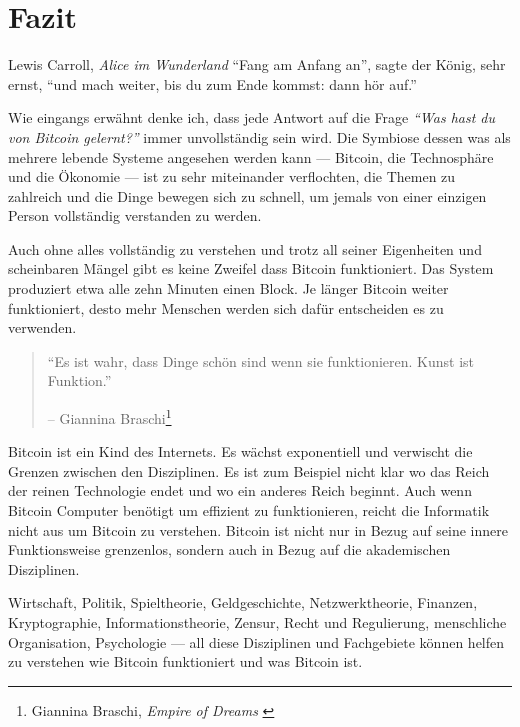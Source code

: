 \label{ch:conclusion}

\chapter*{Fazit}

\begin{chapquote}{Lewis Carroll, \textit{Alice im Wunderland}}
\enquote{Fang am Anfang an}, sagte der König, sehr ernst, \enquote{und mach
weiter, bis du zum Ende kommst: dann hör auf.}
\end{chapquote}

Wie eingangs erwähnt denke ich, dass jede Antwort auf die Frage
\textit{\enquote{Was hast du von Bitcoin gelernt?}} immer unvollständig sein
wird. Die Symbiose dessen was als mehrere lebende Systeme angesehen werden kann
--- Bitcoin, die Technosphäre und die Ökonomie --- ist zu sehr miteinander
verflochten, die Themen zu zahlreich und die Dinge bewegen sich zu schnell, um
jemals von einer einzigen Person vollständig verstanden zu werden.

Auch ohne alles vollständig zu verstehen und trotz all seiner Eigenheiten und
scheinbaren Mängel gibt es keine Zweifel dass Bitcoin funktioniert. Das System
produziert etwa alle zehn Minuten einen Block. Je länger Bitcoin weiter
funktioniert, desto mehr Menschen werden sich dafür entscheiden es zu verwenden.

\begin{quotation}\begin{samepage}
\enquote{Es ist wahr, dass Dinge schön sind wenn sie funktionieren.
Kunst ist Funktion.}
\begin{flushright} -- Giannina Braschi\footnote{Giannina Braschi, \textit{Empire of Dreams} \cite{braschi2011empire}}
\end{flushright}\end{samepage}\end{quotation}

Bitcoin ist ein Kind des Internets. Es wächst exponentiell und
verwischt die Grenzen zwischen den Disziplinen. Es ist zum Beispiel nicht klar
wo das Reich der reinen Technologie endet und wo ein anderes Reich beginnt. Auch
wenn Bitcoin Computer benötigt um effizient zu funktionieren, reicht die
Informatik nicht aus um Bitcoin zu verstehen. Bitcoin ist nicht nur in Bezug auf
seine innere Funktionsweise grenzenlos, sondern auch in Bezug auf die
akademischen Disziplinen.

Wirtschaft, Politik, Spieltheorie, Geldgeschichte, Netzwerktheorie, Finanzen,
Kryptographie, Informationstheorie, Zensur, Recht und Regulierung, menschliche
Organisation, Psychologie --- all diese Disziplinen und Fachgebiete können
helfen zu verstehen wie Bitcoin funktioniert und was Bitcoin ist.

